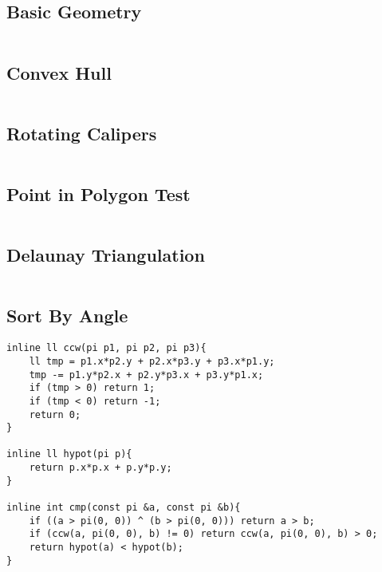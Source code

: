 \subsection{Basic Geometry} %
\inputminted{cpp}{src/Geometry/basic.cpp}

\subsection{Convex Hull} %
\inputminted{cpp}{src/Geometry/hull.cpp}

\subsection{Rotating Calipers} %
\inputminted{cpp}{src/Geometry/rotating.cpp}

\subsection{Point in Polygon Test} %
\inputminted{cpp}{src/Geometry/point-in-polygon.cpp}

\subsection{Delaunay Triangulation} %
\inputminted{cpp}{src/Geometry/delaunay.cpp}

\subsection{Sort By Angle} %
\begin{verbatim}
inline ll ccw(pi p1, pi p2, pi p3){
    ll tmp = p1.x*p2.y + p2.x*p3.y + p3.x*p1.y;
    tmp -= p1.y*p2.x + p2.y*p3.x + p3.y*p1.x;
    if (tmp > 0) return 1;
    if (tmp < 0) return -1;
    return 0;
}

inline ll hypot(pi p){
    return p.x*p.x + p.y*p.y;
}

inline int cmp(const pi &a, const pi &b){
    if ((a > pi(0, 0)) ^ (b > pi(0, 0))) return a > b;
    if (ccw(a, pi(0, 0), b) != 0) return ccw(a, pi(0, 0), b) > 0;
    return hypot(a) < hypot(b);
}
\end{verbatim}
